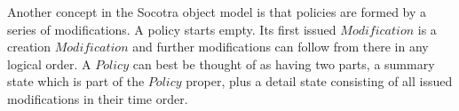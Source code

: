 Another concept in the Socotra object model is that policies are formed by a series of modifications. A
policy starts empty. Its first issued $Modification$ is a creation $Modification$ and further modifications
can follow from there in any logical order. A $Policy$ can best be thought of as having two parts, a summary state
which is part of the $Policy$ proper, plus a detail state consisting of all issued modifications in their
time order.
